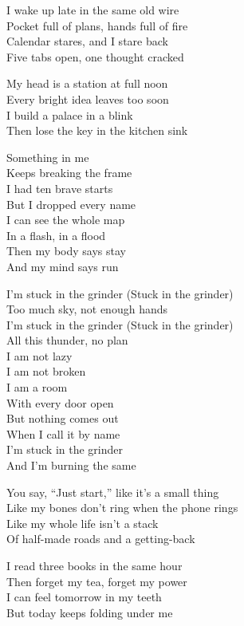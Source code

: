 \begin{lyrics}
I wake up late in the same old wire\\
Pocket full of plans, hands full of fire\\
Calendar stares, and I stare back\\
Five tabs open, one thought cracked

My head is a station at full noon\\
Every bright idea leaves too soon\\
I build a palace in a blink\\
Then lose the key in the kitchen sink

Something in me\\
Keeps breaking the frame\\
I had ten brave starts\\
But I dropped every name\\
I can see the whole map\\
In a flash, in a flood\\
Then my body says stay\\
And my mind says run

I’m stuck in the grinder
(Stuck in the grinder)\\
Too much sky, not enough hands\\
I’m stuck in the grinder
(Stuck in the grinder)\\
All this thunder, no plan\\
I am not lazy\\
I am not broken\\
I am a room\\
With every door open\\
But nothing comes out\\
When I call it by name\\
I’m stuck in the grinder\\
And I’m burning the same

You say, “Just start,” like it’s a small thing\\
Like my bones don’t ring when the phone rings\\
Like my whole life isn’t a stack\\
Of half-made roads and a getting-back

I read three books in the same hour\\
Then forget my tea, forget my power\\
I can feel tomorrow in my teeth\\
But today keeps folding under me


\end{lyrics}
